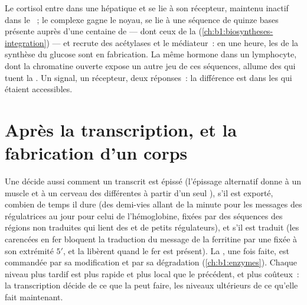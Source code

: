 \begin{example}\label{ex:b1:expression-control:steroid}
Le cortisol entre dans une  hépatique et se lie à son récepteur,
 maintenu inactif dans le ~; le complexe
gagne le noyau, se lie à une séquence de quinze bases présente auprès
d'une centaine de  --- dont ceux de la 
(\cref{ch:b1:biosyntheses-integration}) --- et recrute des acétylases et
le médiateur~: en une heure, les  de la synthèse du glucose sont
en fabrication. La même hormone dans un lymphocyte, dont la chromatine
ouverte expose un autre jeu de ces séquences, allume des  qui tuent
la . Un signal, un récepteur, deux réponses~: la différence est
dans les  qui étaient accessibles.
\end{example}

\section{Après la transcription, et la fabrication d'un corps}

\begin{proposition}\label{prop:b1:expression-control:posttranscriptional}
Une  décide aussi comment un transcrit est épissé
(l'épissage alternatif donne à un muscle et à un cerveau des 
différentes à partir d'un seul ), s'il est exporté, combien de temps
il dure (des demi-vies allant de la minute pour les messages des
 régulatrices au jour pour celui de l'hémoglobine, fixées par
des séquences des régions non traduites qui lient des  et de
petits  régulateurs), et s'il est traduit (les  carencées en
fer bloquent la traduction du message de la ferritine par une 
fixée à son extrémité $5'$, et la libèrent quand le fer est présent). La
, une fois faite, est commandée par sa modification et par sa
dégradation (\cref{ch:b1:enzymes}). Chaque niveau plus tardif est plus
rapide et plus local que le précédent, et plus coûteux~: la
transcription décide de ce que la  peut faire, les niveaux
ultérieurs de ce qu'elle fait maintenant.
\end{proposition}

